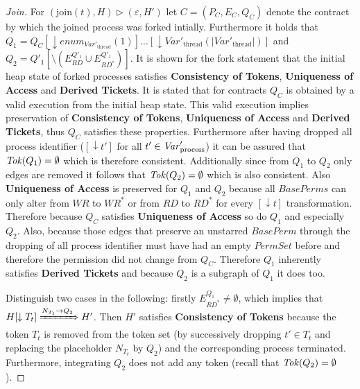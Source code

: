 	\begin{proof}[Join]
		For $(\text{join}(t), H)\rhd(\varepsilon,H')$
		let $C = (P_{C}, E_{C}, Q_{C})$ denote the contract by which the joined
		process was forked intially. Furthermore it holds that\\ $Q_{1} = Q_{C}
		[\downarrow\mathit{enum}_{\mathit{Var}'_{\text{thread}}}(1)]\dots
		[\downarrow\mathit{Var}'_{\text{thread}}
		(|\mathit{Var}'_{\text{thread}}|)]$ and $Q_{2} = Q'_{1}[\setminus
		(E^{Q'_{1}}_{\mathit{RD}}\cup E^{Q'_{1}}_{\mathit{RD^{\ast}}})]$.
		It is shown for the fork statement that the initial heap state of
		forked processes satisfies \textbf{Consistency of Tokens},
		\textbf{Uniqueness of Access} and \textbf{Derived Tickets}.
		It is stated that for contracts $Q_{C}$ is obtained by a valid
		execution from the initial heap state. This valid execution implies
		preservation of \textbf{Consistency of Tokens},
		\textbf{Uniqueness of Access} and \textbf{Derived Tickets},
		thus $Q_{C}$ satisfies these properties. Furthermore after having dropped
		all process identifier ($[\downarrow t']$ for all $t'\in \mathit{Var}_{\text{process}}'$) it can be
		assured that $\mathit{Tok}(Q_{1}) = \emptyset$ which is therefore consistent.
		Additionally since from $Q_{1}$ to $Q_{2}$ only edges are removed it
		follows that $\mathit{Tok}(Q_{2}) = \emptyset$ which is also consistent.
		Also \textbf{Uniqueness of Access}
		is preserved for $Q_{1}$ and $Q_{2}$ because all $\mathit{BasePerms}$ can
		only alter from $\mathit{WR}$ to $\mathit{WR}^{\ast}$ or from
		$\mathit{RD}$ to $\mathit{RD}^{\ast}$ for every $[\downarrow t]$
		transformation. Therefore because $Q_{C}$
		satisfies \textbf{Uniqueness of Access} so do $Q_{1}$ and especially
		$Q_{2}$. Also, because those edges that preserve an unstarred
		$\mathit{BasePerm}$ through the dropping of all process identifier must
		have had an empty $\mathit{PermSet}$ before and therefore the permission
		did not change from $Q_{C}$. Therefore $Q_{1}$ inherently satisfies
		\textbf{Derived Tickets} and because $Q_{2}$ is a subgraph of $Q_{1}$ it
		does too.

		Distinguish two cases in the following: firstly
		$E^{Q_{1}}_{\mathit{RD}^{\ast}}\neq\emptyset$, which implies that
		$H[\downarrow T_{t}]\xRightarrow{N_{T_{t}}\rightarrow Q_{2}}H'$. Then
		$H'$ satisfies \textbf{Consistency of Tokens} because the token $T_{t}$
		is removed from the token set (by successively dropping $t'\in T_{t}$ and
		replacing the placeholder $N_{T_{t}}$ by $Q_{2}$) and the corresponding
		process terminated.  Furthermore, integrating $Q_{2}$ does not add any
		token (recall that $\mathit{Tok}(Q_{2}) = \emptyset$).


\end{proof}
